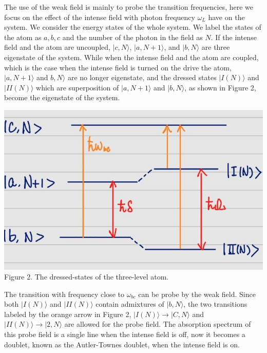 \documentclass[11pt, oneside]{book}
\theoremstyle{break}
\theoremstyle{break}
\begin{document}
The use of the weak field is mainly to probe the transition frequencies, here we focus on the effect of the intense field with photon frequency $\omega_L$ have on the system. We consider the energy states of the whole system. We label the states of the atom as $a,b,c$ and the number of the photon in the field as $N$. If the intense field and the atom are uncoupled, $|c,N\rangle$, $|a,N+1\rangle$, and $|b,N\rangle$ are three eigenstate of the system. While when the intense field and the atom are coupled, which is the case when the intense field is turned on the drive the atom, $|a,N+1\rangle$ and $b,N\rangle$ are no longer eigenstate, and the dressed states $|I(N)\rangle$ and $|II(N)\rangle$ which are superposition of $|a,N+1\rangle$ and $|b,N\rangle$, as shown in Figure 2, become the eigenstate of the system. \\

\begin{center}
\includegraphics[scale=0.36]{542HW6/2}\\
Figure 2. The dressed-states of the three-level atom. 
\end{center}

The transition with frequency close to $\omega_{bc}$ can be probe by the weak field.
Since both $|I(N)\rangle$ and $|II(N)\rangle$ contain admixtures of
$|b, N\rangle$, the two transitions labeled by the orange arrow in Figure 2, $|I(N)\rangle \to |C,N\rangle$ and $|II(N)\rangle \to |2,N\rangle$ are allowed for the probe field. The absorption spectrum of this probe field is a single line when the intense field is off, now it becomes a doublet, known as the Autler-Townes doublet, when the intense field is on.\\
\end{document}
